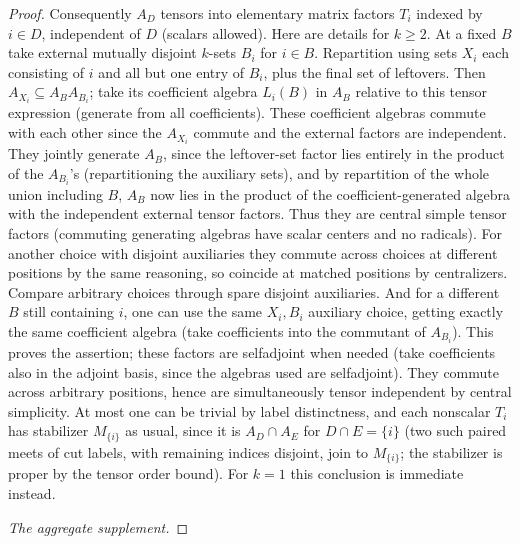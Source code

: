\begin{proof}
Consequently \(A_D\) tensors into elementary matrix factors \(T_i\) indexed by \(i\in D\), independent of \(D\) (scalars allowed). Here are details for \(k\ge2\). At a fixed \(B\) take external mutually disjoint \(k\)-sets \(B_i\) for \(i\in B\). Repartition using sets \(X_i\) each consisting of \(i\) and all but one entry of \(B_i\), plus the final set of leftovers. Then \(A_{X_i}\subseteq A_B A_{B_i}\); take its coefficient algebra \(L_i(B)\) in \(A_B\) relative to this tensor expression (generate from all coefficients). These coefficient algebras commute with each other since the \(A_{X_i}\) commute and the external factors are independent. They jointly generate \(A_B\), since the leftover-set factor lies entirely in the product of the \(A_{B_i}\)'s (repartitioning the auxiliary sets), and by repartition of the whole union including \(B\), \(A_B\) now lies in the product of the coefficient-generated algebra with the independent external tensor factors. Thus they are central simple tensor factors (commuting generating algebras have scalar centers and no radicals). For another choice with disjoint auxiliaries they commute across choices at different positions by the same reasoning, so coincide at matched positions by centralizers. Compare arbitrary choices through spare disjoint auxiliaries. And for a different \(B\) still containing \(i\), one can use the same \(X_i,B_i\) auxiliary choice, getting exactly the same coefficient algebra (take coefficients into the commutant of \(A_{B_i}\)). This proves the assertion; these factors are selfadjoint when needed (take coefficients also in the adjoint basis, since the algebras used are selfadjoint). They commute across arbitrary positions, hence are simultaneously tensor independent by central simplicity. At most one can be trivial by label distinctness, and each nonscalar \(T_i\) has stabilizer \(M_{\{i\}}\) as usual, since it is \(A_D\cap A_E\) for \(D\cap E=\{i\}\) (two such paired meets of cut labels, with remaining indices disjoint, join to \(M_{\{i\}}\); the stabilizer is proper by the tensor order bound). For \(k=1\) this conclusion is immediate instead.

\noindent\emph{The aggregate supplement.}


\end{proof}
